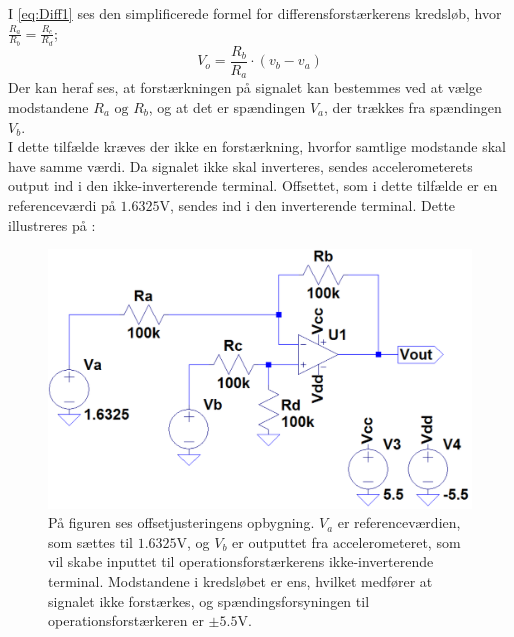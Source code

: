 \noindent I \eqref{eq:Diff1} ses den simplificerede formel for differensforstærkerens kredsløb, hvor $\frac{R_a}{R_b} = \frac{R_c}{R_d}$; \cite{Nilsson2011}
\begin{equation}\label{eq:Diff1}
V_o = \frac{R_b}{R_a} \cdot (v_b - v_a)
\end{equation}
\noindent Der kan heraf ses, at forstærkningen på signalet kan bestemmes ved at vælge modstandene $R_a\text{ og }R_b$, og at det er spændingen $V_{a}$, der trækkes fra spændingen $V_{b}$. \\
I dette tilfælde kræves der ikke en forstærkning, hvorfor samtlige modstande skal have samme værdi. Da signalet ikke skal inverteres, sendes accelerometerets output ind i den ikke-inverterende terminal. Offsettet, som i dette tilfælde er en referenceværdi på $1.6325$V, sendes ind i den inverterende terminal. Dette illustreres på :
\begin{figure}[H]
\centering
\includegraphics[scale=0.4]{figures/cProblemloesning/Offset_generisk.png}
\caption{På figuren ses offsetjusteringens opbygning. $V_{a}$ er referenceværdien, som sættes til $1.6325$V, og $V_{b}$ er outputtet fra accelerometeret, som vil skabe inputtet til operationsforstærkerens ikke-inverterende terminal. Modstandene i kredsløbet er ens, hvilket medfører at signalet ikke forstærkes, og spændingsforsyningen til operationsforstærkeren er $\pm5.5$V.}
\label{fig:Offset_generisk}
\end{figure}


